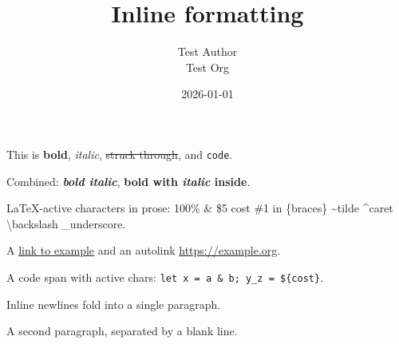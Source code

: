 \documentclass[11pt,a4paper]{article}
\title{Inline formatting}
\author{Test Author \\ Test Org}
\date{2026-01-01}
\theoremstyle{definition}
\begin{document}
\maketitle

This is \textbf{bold}, \emph{italic}, \sout{struck through}, and \texttt{code}.


Combined: \emph{\textbf{bold italic}}, \textbf{bold with \emph{italic} inside}.


LaTeX-active characters in prose: 100\% \& \$5 cost \#1 in \{braces\} \textasciitilde{}tilde \textasciicircum{}caret \textbackslash{}backslash \_underscore.


A \href{https://example.com}{link to example} and an autolink \url{https://example.org}.


A code span with active chars: \texttt{let x = a \& b; y\_z = \$\{cost\}}.


Inline newlines fold into
a single paragraph.


A second paragraph, separated by a blank line.
\end{document}
